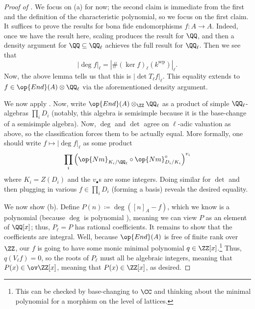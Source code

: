 \documentclass[../notes.tex]{subfiles}
\begin{document}
\begin{proof}[Proof of ]
	We focus on (a) for now; the second claim is immediate from the first and the definition of the characteristic polynomial, so we focus on the first claim. It suffices to prove the results for bona fide endomorphisms $f\colon A\to A$. Indeed, once we have the result here, scaling produces the result for $\QQ$, and then a density argument for $\QQ\subseteq\QQ_\ell$ achieves the full result for $\QQ_\ell$. Then we see that
	\[\left|\deg f\right|_\ell=\left|\#(\ker f)_\ell(k^{\mathrm{sep}})\right|_\ell.\]
	Now, the above lemma tells us that this is $\left|\det T_\ell f\right|_\ell$. This equality extends to $f\in\op{End}(A)\otimes\QQ_\ell$ via the aforementioned density argument.

	We now apply . Now, write $\op{End}(A)\otimes_\ZZ\QQ_\ell$ as a product of simple $\QQ_\ell$-algebras $\prod_iD_i$ (notably, this algebra is semisimple because it is the base-change of a semisimple algebra). Now, $\deg$ and $\det$ agree on $\ell$-adic valuation as above, so the classification  forces them to be actually equal. More formally, one should write $f\mapsto\left|\deg f\right|_\ell$ as some product
	\[\prod_i\left(\op{Nm}_{K_i/\QQ_\ell}\circ\op{Nm}_{D_i/K_i}^\circ\right)^{v_i}\]
	where $K_i=Z(D_i)$ and the $v_\bullet$s are some integers. Doing similar for $\det$ and then plugging in various $f\in\prod_iD_i$ (forming a basis) reveals the desired equality.

	We now show (b). Define $P(n)\coloneqq\deg([n]_A-f)$, which we know is a polynomial (because $\deg$ is polynomial ), meaning we can view $P$ as an element of $\QQ[x]$; thus, $P_\ell=P$ has rational coefficients. It remains to show that the coefficients are integral. Well, because $\op{End}(A)$ is free of finite rank over $\ZZ$, our $f$ is going to have some monic minimal polynomial $q\in\ZZ[x]$.\footnote{This can be checked by base-changing to $\CC$ and thinking about the minimal polynomial for a morphism on the level of lattices.} Thus, $q(V_\ell f)=0$, so the roots of $P_\ell$ must all be algebraic integers, meaning that $P(x)\in\ov\ZZ[x]$, meaning that $P(x)\in\ZZ[x]$, as desired.
\end{proof}
\end{document}
